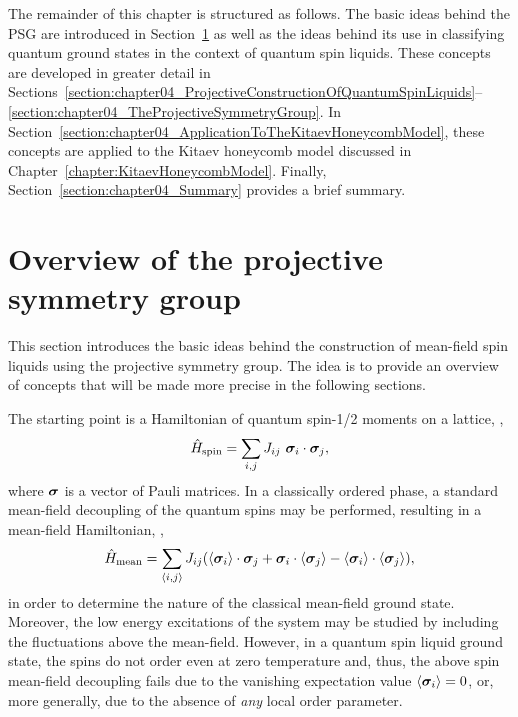 The remainder of this chapter is structured as follows.
The basic ideas behind the PSG are introduced in Section~\ref{section:chapter04_OverviewOfTheProjectiveSymmetryGroup} as well as the ideas behind its use in classifying quantum ground states in the context of quantum spin liquids.
These concepts are developed in greater detail in Sections~\ref{section:chapter04_ProjectiveConstructionOfQuantumSpinLiquids}--\ref{section:chapter04_TheProjectiveSymmetryGroup}.
In Section~\ref{section:chapter04_ApplicationToTheKitaevHoneycombModel}, these concepts are applied to the Kitaev honeycomb model discussed in Chapter~\ref{chapter:KitaevHoneycombModel}.
Finally, Section~\ref{section:chapter04_Summary} provides a brief summary.


%
\section{Overview of the projective symmetry group}
\label{section:chapter04_OverviewOfTheProjectiveSymmetryGroup}
%
This section introduces the basic ideas behind the construction of mean-field spin liquids using the projective symmetry group.
The idea is to provide an overview of concepts that will be made more precise in the following sections.

The starting point is a Hamiltonian of quantum spin-1/2 moments on a lattice, \eg,
%
\begin{equation}
	\hat{H}_{\rm spin} = \sum_{i,j} J_{ij}~\bm{\sigma}_i \cdot \bm{\sigma}_j,
\end{equation}
%
where $\bm{\sigma}$ is a vector of Pauli matrices.
In a classically ordered phase, a standard mean-field decoupling of the quantum spins may be performed, resulting in a mean-field Hamiltonian, \eg,
%
\begin{equation}
	\hat{H}_{\rm mean} = \sum_{\langle i,j \rangle} J_{ij} (\langle \bm{\sigma}_i \rangle \cdot \bm{\sigma}_j + \bm{\sigma}_i \cdot \langle \bm{\sigma}_j \rangle - \langle \bm{\sigma}_i \rangle \cdot \langle \bm{\sigma}_j \rangle),
\end{equation}
%
in order to determine the nature of the classical mean-field ground state.
Moreover, the low energy excitations of the system may be studied by including the fluctuations above the mean-field.
However, in a quantum spin liquid ground state, the spins do not order even at zero temperature and, thus, the above spin mean-field decoupling fails due to the vanishing expectation value $\langle \bm{\sigma}_i \rangle = 0$, or, more generally, due to the absence of \textit{any} local order parameter.

